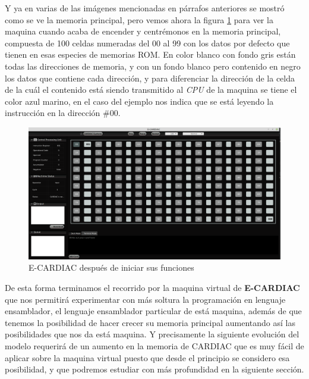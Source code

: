 \documentclass[letterpaper,12pt,oneside]{book}
\begin{document}
	Y ya en varias de las imágenes mencionadas en párrafos anteriores se mostró como se ve la memoria principal, pero vemos ahora la figura \ref{fig:enceCardiac} para
	ver la maquina cuando acaba de encender y centrémonos en la memoria principal, compuesta de 100 celdas numeradas del 00 al 99 con los datos
	por defecto que tienen en esas especies de memorias ROM. En color blanco con fondo gris están todas las direcciones de memoria, y con un fondo blanco pero
	contenido en negro los datos que contiene cada dirección, y para diferenciar la dirección de la celda de la cuál el contenido está siendo transmitido
	al \textit{CPU} de la maquina se tiene el color azul marino, en el caso del ejemplo nos indica que se está leyendo la instrucción en la dirección \#00.
	
	
%
	
	\begin{figure}[t!]
			\includegraphics[scale=0.28]{media/ECARDIAC/ECARDIAC_P2.png}
			\caption{E-CARDIAC después de iniciar sus funciones}
			\label{fig:enceCardiac}
			
	\end{figure}
	
	
	De esta forma terminamos el recorrido por la maquina virtual de \textbf{E-CARDIAC} que nos permitirá experimentar con más soltura la programación en
	lenguaje ensamblador, el lenguaje ensamblador particular de está maquina, además de que tenemos la posibilidad de hacer crecer su memoria principal aumentando
	así las posibilidades que nos da está maquina. Y precisamente la siguiente evolución del modelo requerirá de un aumento en la memoria de CARDIAC que es muy fácil
	de aplicar sobre la maquina virtual puesto que desde el principio se considero esa posibilidad, y que podremos estudiar con más profundidad en la siguiente
	sección.
\end{document}
